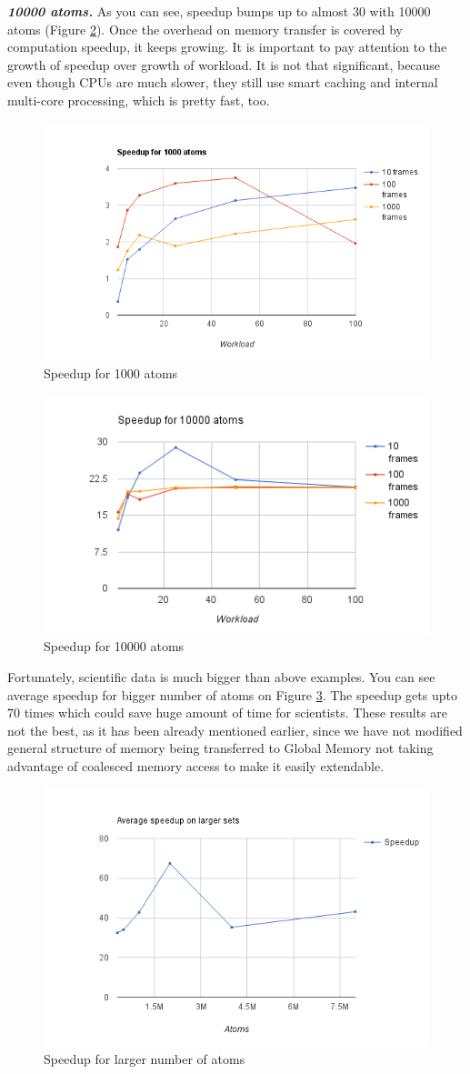 \documentclass[11pt,a4paper]{report}
\begin{document}
\emph{\textbf{10000 atoms.}}
As you can see, speedup bumps up to almost 30 with 10000 atoms (Figure \ref{fg:chart_10000}). Once the overhead on memory transfer is covered by computation speedup, it keeps growing. It is important to pay attention to the growth of speedup over growth of workload. It is not that significant, because even though CPUs are much slower, they still use smart caching and internal multi-core processing, which is pretty fast, too.

\begin{figure}
 \centerline{ \includegraphics[width=0.5\columnwidth]{images/chart_1000}}
 \caption{Speedup for 1000 atoms}
 \label{fg:chart_1000}
\end{figure}

\begin{figure}
 \centerline{\includegraphics[width=0.5\columnwidth]{images/chart_10000}}
 \caption{Speedup for 10000 atoms}
 \label{fg:chart_10000}
\end{figure}

Fortunately, scientific data is much bigger than above examples. You can see average speedup for bigger number of atoms on Figure \ref{fg:chart_max}. The speedup gets upto 70 times which could save huge amount of time for scientists. These results are not the best, as it has been already mentioned earlier, since we have not modified general structure of memory being transferred to Global Memory not taking advantage of coalesced memory access to make it easily extendable. 

\begin{figure}
 \centerline{\includegraphics[width=0.5\columnwidth]{images/chart_max}}
 \caption{Speedup for larger number of atoms}
 \label{fg:chart_max}
\end{figure}
\end{document}
